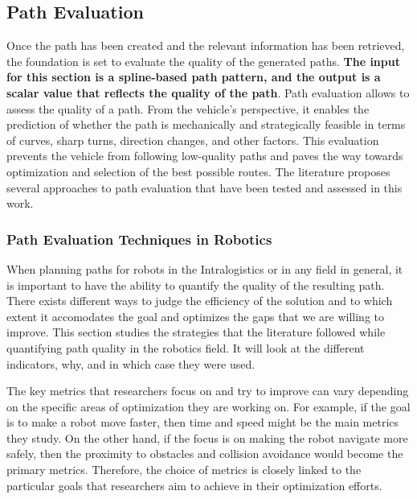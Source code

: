 \subsection{Path Evaluation}
Once the path has been created and the relevant information has been retrieved, the foundation is set to evaluate the 
quality of the generated paths. \textbf{The input for this section is a spline-based path pattern, and the 
output is a scalar value that reflects the quality of the path}.
Path evaluation allows to assess the quality of a path. From the vehicle's perspective, it enables the 
prediction of whether the path is mechanically and strategically feasible in terms of curves, sharp turns, direction 
changes, and other factors. This evaluation prevents the vehicle from following low-quality paths and paves the way 
towards optimization and selection of the best possible routes.
The literature proposes several approaches to path evaluation 
that have been tested and assessed in this work.

\subsubsection{Path Evaluation Techniques in Robotics}
 
When planning paths for robots in the Intralogistics or in any field in general, it is important to have the ability 
to quantify the quality of the resulting path. There exists different ways to judge the efficiency of the solution
and to which extent it accomodates the goal and optimizes the gaps that we are willing to improve.
This section studies the strategies that the literature followed while quantifying path quality in the robotics
field. It will look at the different indicators, why, and in which case they were used. 

The key metrics that researchers focus on and try to improve can vary depending on the specific areas of 
optimization they are working on. For example, if the goal is to make a robot move faster, then time 
and speed might be the main metrics they study. On the other hand, if the focus is on making the robot 
navigate more safely, then the proximity to obstacles and collision avoidance would become the primary 
metrics. Therefore, the choice of metrics is closely linked to the particular goals that researchers 
aim to achieve in their optimization efforts.

